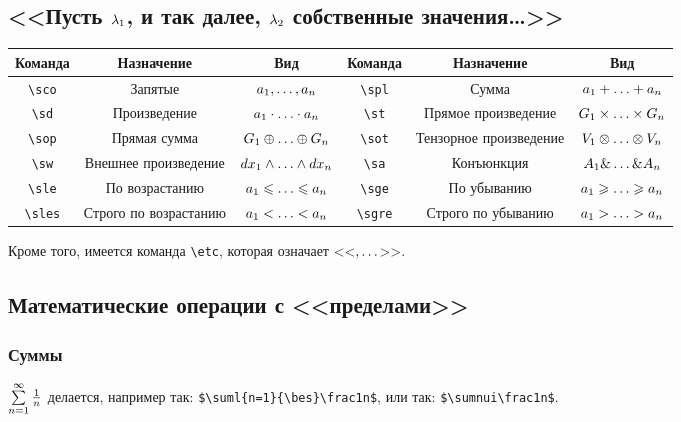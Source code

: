 \documentclass[a4paper]{article}
\begin{document}
\subsection{<<Пусть $\lambda_1$, и так далее, $\lambda_2$ собственные значения\ldots>>}
\begin{center}
\begin{tabular}{|c|c|c||c|c|c|}
\hline \textbf{Команда} & \textbf{Назначение} & \textbf{Вид} & \textbf{Команда} & \textbf{Назначение} & \textbf{Вид} \\
\hline \verb$\sco$ & Запятые & $a_1,\ldots, a_n$ & \verb$\spl$ & Сумма & $a_1\spl a_n$ \\
\hline \verb$\sd$ & Произведение & $a_1\sd a_n$ & \verb$\st$ & Прямое произведение & $G_1\st G_n$ \\
\hline \verb$\sop$ & Прямая сумма & $G_1\sop G_n$ & \verb$\sot$ & Тензорное произведение & $V_1\sot V_n$ \\
\hline \verb$\sw$ & Внешнее произведение & $dx_1 \sw dx_n$ &  \verb'\sa' & Конъюнкция & $A_1\sa A_n$\\
\hline \verb$\sle$ & По возрастанию & $a_1 \sle a_n$ &  \verb'\sge' & По убыванию & $a_1\sge a_n$\\
\hline \verb$\sles$ & Строго по возрастанию & $a_1 \sles a_n$ &  \verb'\sgre' & Строго по убыванию & $a_1\sgre a_n$\\
\hline
\end{tabular}
\end{center}
Кроме того, имеется команда \verb'\etc', которая означает <<$,\ldots$>>.


\subsection{Математические операции с <<пределами>>}

\subsubsection{Суммы}

\begin{ex}
$\sum\limits_{{n=1}}^{{\infty}}\frac1n$ делается, например так: \verb"$\suml{n=1}{\bes}\frac1n$", или так:
\verb"$\sumnui\frac1n$".
\end{ex}
\end{document}
